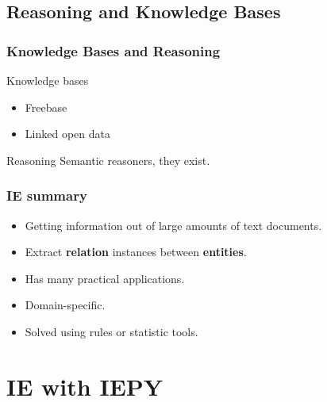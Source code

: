 \documentclass{beamer}
\begin{document}

\subsection{Reasoning and Knowledge Bases}


\begin{frame}
\frametitle{Knowledge Bases and Reasoning}

\begin{block}{Knowledge bases}
\begin{itemize}
\item Freebase  %
\item Linked open data   %
\end{itemize}
\end{block}

\pause

\begin{block}{Reasoning}
Semantic reasoners, they exist.  %
\end{block}

\end{frame}



\begin{frame}
\frametitle{IE summary}

\begin{itemize}
    \item Getting information out of large amounts of text documents.
    \item Extract {\bf relation} instances between {\bf entities}.
    \item Has many practical applications.
    \item Domain-specific.
    \item Solved using rules or statistic tools.
\end{itemize}

\end{frame}


\section{IE with IEPY}
\end{document}
